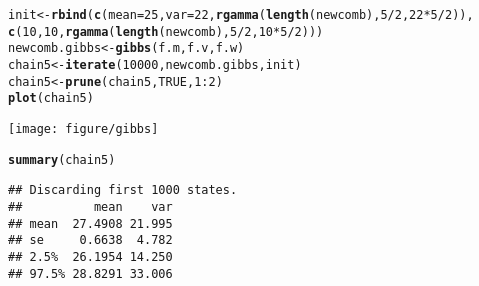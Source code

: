 \documentclass{article}\usepackage[]{graphicx}\usepackage[]{color}
\makeatletter
\def\maxwidth{ %
  \ifdim\Gin@nat@width>\linewidth
    \linewidth
  \else
    \Gin@nat@width
  \fi
}
\newcommand{\hlnum}[1]{\textcolor[rgb]{0.686,0.059,0.569}{#1}}%
\newcommand{\hlopt}[1]{\textcolor[rgb]{0,0,0}{#1}}%
\newcommand{\hlstd}[1]{\textcolor[rgb]{0.345,0.345,0.345}{#1}}%
\newcommand{\hlkwb}[1]{\textcolor[rgb]{0.69,0.353,0.396}{#1}}%
\newcommand{\hlkwc}[1]{\textcolor[rgb]{0.333,0.667,0.333}{#1}}%
\newcommand{\hlkwd}[1]{\textcolor[rgb]{0.737,0.353,0.396}{\textbf{#1}}}%
\newenvironment{kframe}{%
 \def\at@end@of@kframe{}%
 \ifinner\ifhmode%
  \def\at@end@of@kframe{\end{minipage}}%
  \begin{minipage}{\columnwidth}%
 \fi\fi%
 \def\FrameCommand##1{\hskip\@totalleftmargin \hskip-\fboxsep
 \colorbox{shadecolor}{##1}\hskip-\fboxsep
     \hskip-\linewidth \hskip-\@totalleftmargin \hskip\columnwidth}%
 \MakeFramed {\advance\hsize-\width
   \@totalleftmargin\z@ \linewidth\hsize
   \@setminipage}}%
 {\par\unskip\endMakeFramed%
 \at@end@of@kframe}
\newenvironment{knitrout}{}{} %
\makeatother
\begin{document}
\begin{knitrout}
\color{fgcolor}\begin{kframe}
\begin{alltt}
\hlstd{init} \hlkwb{<-} \hlkwd{rbind}\hlstd{(}\hlkwd{c}\hlstd{(}\hlkwc{mean} \hlstd{=} \hlnum{25}\hlstd{,} \hlkwc{var} \hlstd{=} \hlnum{22}\hlstd{,} \hlkwd{rgamma}\hlstd{(}\hlkwd{length}\hlstd{(newcomb),} \hlnum{5}\hlopt{/}\hlnum{2}\hlstd{,} \hlnum{22} \hlopt{*} \hlnum{5}\hlopt{/}\hlnum{2}\hlstd{)),}
    \hlkwd{c}\hlstd{(}\hlnum{10}\hlstd{,} \hlnum{10}\hlstd{,} \hlkwd{rgamma}\hlstd{(}\hlkwd{length}\hlstd{(newcomb),} \hlnum{5}\hlopt{/}\hlnum{2}\hlstd{,} \hlnum{10} \hlopt{*} \hlnum{5}\hlopt{/}\hlnum{2}\hlstd{)))}
\hlstd{newcomb.gibbs} \hlkwb{<-} \hlkwd{gibbs}\hlstd{(f.m, f.v, f.w)}
\hlstd{chain5} \hlkwb{<-} \hlkwd{iterate}\hlstd{(}\hlnum{10000}\hlstd{, newcomb.gibbs, init)}
\hlstd{chain5} \hlkwb{<-} \hlkwd{prune}\hlstd{(chain5,} \hlnum{TRUE}\hlstd{,} \hlnum{1}\hlopt{:}\hlnum{2}\hlstd{)}
\hlkwd{plot}\hlstd{(chain5)}
\end{alltt}
\end{kframe}
\texttt{[image: figure/gibbs]} 
\begin{kframe}\begin{alltt}
\hlkwd{summary}\hlstd{(chain5)}
\end{alltt}
\begin{verbatim}
## Discarding first 1000 states.
##          mean    var
## mean  27.4908 21.995
## se     0.6638  4.782
## 2.5%  26.1954 14.250
## 97.5% 28.8291 33.006
\end{verbatim}
\end{kframe}
\end{knitrout}
\end{document}
